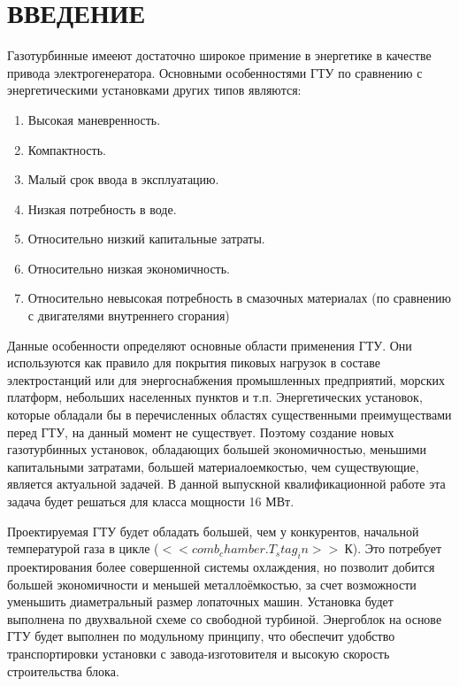 \documentclass[a4paper,12pt]{article}
\begin{document}
    \section{ВВЕДЕНИЕ}
    Газотурбинные имееют достаточно широкое примение в энергетике в качестве привода электрогенератора.
    Основными особенностями ГТУ по сравнению с энергетическими установками других типов являются:
    \begin{enumerate}
        \item Высокая маневренность.
        \item Компактность.
        \item Малый срок ввода в эксплуатацию.
        \item Низкая потребность в воде.
        \item Относительно низкий капитальные затраты.
        \item Относительно низкая экономичность.
        \item Относительно невысокая потребность в смазочных материалах (по сравнению с двигателями
        внутреннего сгорания)
    \end{enumerate}
    Данные особенности определяют основные области применения ГТУ.
    Они используются как правило для покрытия пиковых нагрузок в составе электростанций или для
    энергоснабжения промышленных предприятий, морских платформ, небольших населенных пунктов и т.п.
    Энергетических установок, которые обладали бы в перечисленных областях существенными преимуществами перед ГТУ, на
    данный момент не существует.
    Поэтому создание новых газотурбинных установок, обладающих большей экономичностью,
    меньшими капитальными затратами, большей материалоемкостью, чем существующие, является актуальной задачей.
    В данной выпускной квалификационной работе эта задача будет решаться для класса мощности 16 МВт.

    Проектируемая ГТУ будет обладать большей, чем у конкурентов, начальной температурой газа в цикле
    ($ << comb_chamber.T_stag_in >>\ К $).
    Это потребует проектирования более совершенной системы охлаждения, но позволит добится большей экономичности и
    меньшей металлоёмкостью, за счет возможности уменьшить диаметральный размер лопаточных машин.
    Установка будет выполнена по двухвальной схеме со свободной турбиной.
    Энергоблок на основе ГТУ будет выполнен по модульному принципу, что обеспечит удобство транспортировки установки с
    завода-изготовителя и высокую скорость строительства блока.

    \newpage
\end{document}

